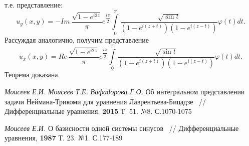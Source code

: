 \documentclass[a4paper, 9pt]{article}
\begin{document}
		т.е. представление:
		\begin{equation*}
			u_y(x,y) = - Im\  \dfrac{ \sqrt{1 - e^{i2z}} }{\pi} e^{\dfrac{iz}{2}}  \int\limits_0^\pi  \dfrac{\sqrt{\sin{t}} }{\left(1 - e^{i(z+t)} \right) \left(1 - e^{i(z-t)}\right)}  \varphi(t) dt.
		\end{equation*}
	 	Рассуждая аналогично, получим представление
	 		\begin{equation}
	 			u_x(x,y) = Re\   \dfrac{ \sqrt{1 - e^{i2z}} }{\pi} e^{\dfrac{iz}{2}} \int\limits_0^\pi  \dfrac{\sqrt{\sin{t}}}{\left(1 - e^{i(z+t)} \right) \left(1 - e^{i(z-t)}\right)}  \varphi(t) dt.
	 		\end{equation}
		Теорема доказана.
	\newpage
	\vspace{-2.3cm}
	\renewcommand{\refname}{\begin{center}
			{\normalsize \rm СПИСОК ЛИТЕРАТУРЫ} \end{center}}
	
	\begin{thebibliography}{99} \itemsep=-2pt \vspace{-0.8cm}
		
		
		 \textit{Моисеев Е.И.} \textit{Моисеев Т.Е.} \textit{Вафадорова Г.О.} Об интегральном представлении задачи Неймана-Трикоми для уравнения Лаврентьева-Бицадзе ~// Дифференциальные уравнения, \textbf{2015} Т. 51. №8. С.1070-1075
		
		 \textit{Моисеев Е.И.} О базисности одной системы синусов ~// Дифференциальные уравнения, \textbf{1987} Т. 23. №1. С.177-189
		
	\end{thebibliography}
\end{document}

